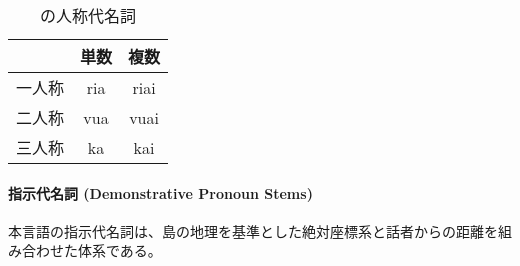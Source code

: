 \begin{table}[H]
    \centering
    \begin{tabular}{lcc}
        \toprule
        & 単数 & 複数  \\
        \midrule
        一人称 & ria & riai \\
        二人称 & vua & vuai \\
        三人称 & ka & kai \\
        \bottomrule
    \end{tabular}
    \caption{\centering \langname の人称代名詞}
    \label{tab:pronouns}
\end{table}

\paragraph{指示代名詞 (Demonstrative Pronoun Stems)}
本言語の指示代名詞は、島の地理を基準とした絶対座標系と話者からの距離を組み合わせた体系である。

